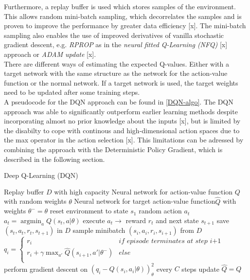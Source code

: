 Furthermore, a replay buffer is used which stores samples of the environment. This allows random mini-batch sampling, which decorrelates the samples and is proven to improve the performance by greater data efficiency [x]. The mini-batch sampling also enables the use of improved derivatives of vanilla stochastic gradient descent, e.g. \textit{RPROP} as in the \textit{neural fitted Q-Learning (NFQ)} [x] approach or \textit{ADAM update} [x].\\
There are different ways of estimating the expected Q-values. Either with a target network with the same structure as the network for the action-value function or the normal network. If a target network is used, the target weights need to be updated after some 
training steps.\\
A pseudocode for the DQN approach can be found in \ref{DQN-algo}.
The DQN approach was able to significantly outperform earlier learning methods despite incorporating almost no prior knowledge about the inputs [x], but is limited by the disabilty to cope with continous and high-dimensional action spaces due to the max operator in the action selection [x]. This limitations can be adressed by combining the approach with the Deterministic Policy Gradient, which is described in the following section.

\begin{algorithm}
	\caption{Deep Q-Learning (DQN)}\label{DQN-algo}
	\begin{algorithmic}
		\REQUIRE Replay buffer $\mathit{D}$ with high capacity
		\REQUIRE Neural network for action-value function $\mathit{Q}$
		with random weights $\theta$
		\REQUIRE Neural network for target action-value function$
		\mathit{\hat{Q}}$ with weights $\theta^-=\theta$
		\STATE reset environment to state $s_1$
		\STATE random action $a_t$
		\ELSE
		\STATE $a_t=\operatorname*{argmin}_a Q(s_t,a|\theta)$
		\ENDIF
		\STATE execute $a_t \rightarrow$ reward $r_t$ and next state 
		$s_{t+1}$
		\STATE save $(s_t, a_t, r_t,s_{t+1})$ in $D$
		\STATE sample minibatch $(s_i, a_i, r_i,s_{i+1})$ from $D$
		\STATE $q_i =
			\begin{cases}
			r_i & \textit{if episode terminates at step i+1}\\
			r_i+\gamma \max_{a'}\hat{Q}(s_{i+1}, a'|\theta^{-})& 
			else\\			
			\end{cases}$
		\STATE perform gradient descent on $\left(q_i-Q\left(s_i, 
		a_i|\theta\right)\right)^2_\theta$
		\STATE every $C$ steps update $\hat{Q}=Q$
		\ENDFOR
		\ENDFOR
	\end{algorithmic}
\end{algorithm}


